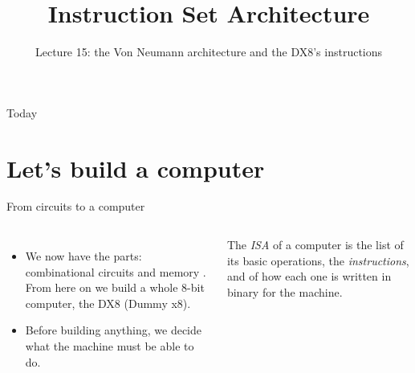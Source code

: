 \documentclass[10pt]{wosm-slides}
\title[Lecture 15 \textperiodcentered\ Instruction Set Architecture]{Instruction Set
  Architecture}
\subtitle{Lecture 15: the Von Neumann architecture and the DX8's instructions}
\begin{document}
\maketitle

\begin{frame}{Today}
  \tableofcontents
\end{frame}

\section{Let's build a computer}

\begin{frame}{From circuits to a computer}
  \begin{columns}[c, totalwidth=\textwidth]
      \begin{itemize}
        \item We now have the parts: combinational circuits  and
          memory . From here on we build a whole 8-bit computer,
          the \alert{DX8} (Dummy x8).
        \item Before building anything, we decide what the machine must be able
          to do.
      \end{itemize}
      \begin{definition}
        The \emph{ISA} of a computer is the list of its basic operations, the
        \emph{instructions}, and of how each one is written in binary for the
        machine.
      \end{definition}
      \centering
      \par\smallskip
  \end{columns}
\end{frame}
\end{document}

